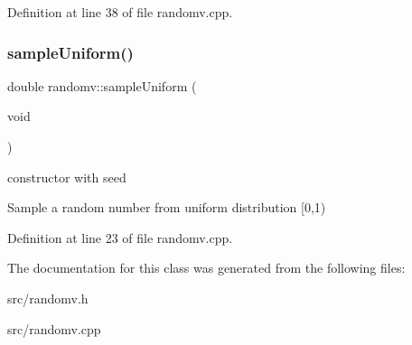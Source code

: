 Definition at line 38 of file randomv.\+cpp.

\mbox{\label{classrandomv_a0d1def37be5addf36b11234e3a7b29d3}} 
\subsubsection{\texorpdfstring{sample\+Uniform()}{sampleUniform()}}
{\footnotesize\ttfamily double randomv\+::sample\+Uniform (\begin{DoxyParamCaption}\item[{void}]{ }\end{DoxyParamCaption})}



constructor with seed 

Sample a random number from uniform distribution \mbox{[}0,1) 

Definition at line 23 of file randomv.\+cpp.



The documentation for this class was generated from the following files\+:\begin{DoxyCompactItemize}
\item 
src/randomv.\+h\item 
src/randomv.\+cpp\end{DoxyCompactItemize}
